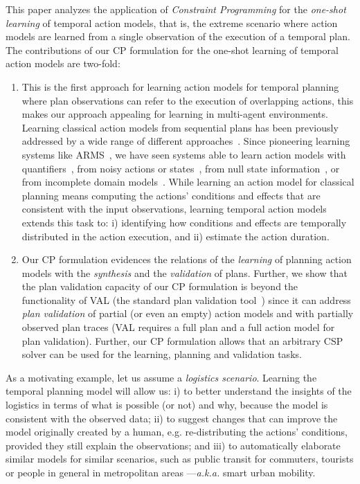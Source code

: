 \documentclass{ecai}
\begin{document}
This paper analyzes the application of {\em Constraint Programming} for the {\em one-shot learning} of temporal action models, that is, the extreme scenario where action models are learned from a single observation of the execution of a temporal plan. The contributions of our CP formulation for the one-shot learning of temporal action models are two-fold:
\begin{enumerate}  
\item This is the first approach for learning action models for temporal planning where plan observations can refer to the execution of overlapping actions, this makes our approach appealing for learning in multi-agent environments. Learning classical action models from sequential plans has been previously addressed by a wide range of different approaches~\cite{arora2018review}. Since pioneering learning systems like ARMS~\cite{yang2007learning}, we have seen systems able to learn action models with quantifiers~\cite{AmirC08,ZhuoYHL10}, from noisy actions or states~\cite{MouraoZPS12,zhuo2013action}, from null state information~\cite{cresswell2013}, or from incomplete domain models~\cite{ZhuoK17,ZhuoNK13}. While learning an action model for classical planning means computing the actions' conditions and effects that are consistent with the input observations, learning temporal action models extends this task to: i) identifying how conditions and effects are temporally distributed in the action execution, and ii) estimate the action duration. 
\item Our CP formulation evidences the relations of the {\em learning} of planning action models with the {\em synthesis} and the {\em validation} of plans. Further, we show that the plan validation capacity of our CP formulation is beyond the functionality of VAL (the standard plan validation tool~\cite{howey2004val}) since it can address {\em plan validation} of partial (or even an empty) action models and with partially observed plan traces (VAL requires a full plan and a full action model for plan validation). Further, our CP formulation allows that an arbitrary CSP solver can be used for the learning, planning and validation tasks.  
\end{enumerate}

As a motivating example, let us assume a {\em logistics scenario}. Learning the temporal planning model will allow us: i) to better understand the insights of the logistics in terms of what is possible (or not) and why, because the model is consistent with the observed data; ii) to suggest changes that can improve the model originally created by a human, e.g. re-distributing the actions' conditions, provided they still explain the observations; and iii) to automatically elaborate similar models for similar scenarios, such as public transit for commuters, tourists or people in general in metropolitan areas ---\emph{a.k.a.} smart urban mobility.
\end{document}
